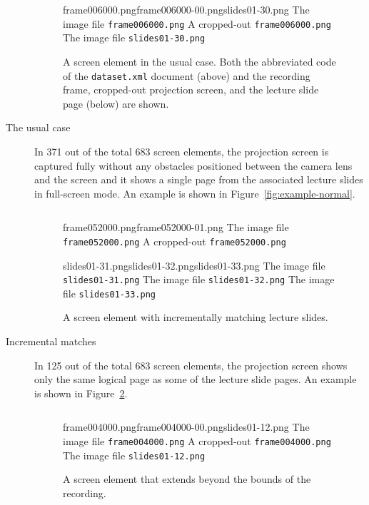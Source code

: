 \begin{description}
  \begin{figure}
    \inputminted{xml}{fig/examples/normal/example.xml}\par
      {frame006000.png}{frame006000-00.png}{slides01-30.png}%
      {The image file \texttt{frame006000.png}}%
      {A cropped-out \texttt{frame006000.png}}%
      {The image file \texttt{slides01-30.png}}
    \caption{A screen element in the usual case. Both the abbreviated code
      of the \texttt{dataset.xml} document (above) and the recording frame,
      cropped-out projection screen, and the lecture slide page (below) are
      shown.}
    \label{fig:example-normal}
    \label{fig:example-first}
  \end{figure}
  \item[The usual case] In 371 out of the total 683 screen elements, the
    projection screen is captured fully without any obstacles positioned
    between the camera lens and the screen and it shows a single page from the
    associated lecture slides in full-screen mode. An example is shown in
    Figure~\ref{fig:example-normal}.

  \begin{figure}
    \inputminted{xml}{fig/examples/incremental/example.xml}\par
      {frame052000.png}{frame052000-01.png}%
      {The image file \texttt{frame052000.png}}%
      {A cropped-out \texttt{frame052000.png}}\par
      {slides01-31.png}{slides01-32.png}{slides01-33.png}%
      {The image file \texttt{slides01-31.png}}%
      {The image file \texttt{slides01-32.png}}%
      {The image file \texttt{slides01-33.png}}
    \caption{A screen element with incrementally matching lecture slides.}
    \label{fig:example-incremental}
  \end{figure}
  \item[Incremental matches] In 125 out of the total 683 screen elements,
    the projection screen shows only the same logical page as some of the
    lecture slide pages. An example is shown in
    Figure~\ref{fig:example-incremental}.

  \begin{figure}
    \inputminted{xml}{fig/examples/beyond-bounds/example.xml}\par
      {frame004000.png}{frame004000-00.png}{slides01-12.png}%
      {The image file \texttt{frame004000.png}}%
      {A cropped-out \texttt{frame004000.png}}%
      {The image file \texttt{slides01-12.png}}
    \caption{A screen element that extends beyond the bounds of the recording.}
    \label{fig:example-beyond-bounds}


\end{figure}
\end{description}
